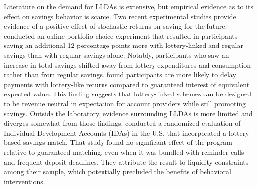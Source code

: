 \documentclass[12pt]{article}
\begin{document}

	Literature on the demand for LLDAs is extensive, but empirical evidence as to its effect on savings behavior is scarce. Two recent experimental studies provide evidence of a positive effect of stochastic returns on saving for the future.  conducted an online portfolio-choice experiment that resulted in participants saving an additional 12 percentage points more with lottery-linked and regular savings than with regular savings alone. Notably, participants who saw an increase in total savings shifted away from lottery expenditures and consumption rather than from regular savings.  found participants are more likely to delay payments with lottery-like returns compared to guaranteed interest of equivalent expected value. This finding suggests that lottery-linked schemes can be designed to be revenue neutral in expectation for account providers while still promoting savings. Outside the laboratory, evidence surrounding LLDAs is more limited and diverges somewhat from those findings.  conducted a randomized evaluation of Individual Development Accounts (IDAs) in the U.S. that incorporated a lottery-based savings match. That study found no significant effect of the program relative to guaranteed matching, even when it was bundled with reminder calls and frequent deposit deadlines. They attribute the result to liquidity constraints among their sample, which potentially precluded the benefits of behavioral interventions.

\end{document}
